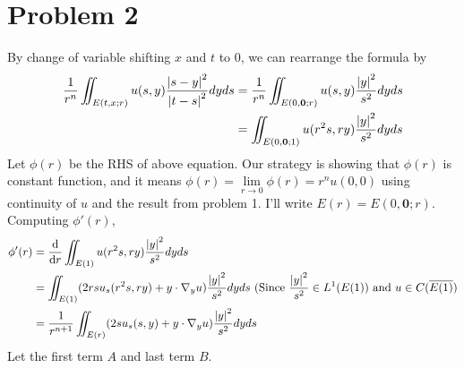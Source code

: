 \documentclass{article}
\begin{document}
\section*{Problem 2}
By change of variable shifting $x$ and $t$ to 0, we can rearrange the formula by 
\begin{equation*}
\begin{split}
\frac{1}{r^n}\iint_{E(t,x;r)}u(s,y)\frac{\abs{s-y}^2}{\abs{t-s}^2}dyds&=\frac{1}{r^n}\iint_{E(0,\bm{0};r)}u(s,y)\frac{\abs{y}^2}{s^2}dyds\\
&=\iint_{E(0,\bm{0};1)}u(r^2s,ry)\frac{\abs{y}^2}{s^2}dyds
\end{split}
\end{equation*}
Let $\phi(r)$ be the RHS of above equation. Our strategy is showing that $\phi(r)$ is constant function, and it means $\phi(r)=\lim\limits_{r\rightarrow 0} \phi(r)=r^n u(0,0)$ using continuity of $u$ and the result from problem 1. I'll write $E(r)=E(0,\bm{0};r)$.
Computing $\phi'(r)$,
\begin{equation*}
\begin{split}
\phi'(r)&=\dv{r}\iint_{E(1)} u(r^2s,ry)\frac{\abs{y}^2}{s^2}dyds \\
&= \iint_{E(1)}(2rsu_s(r^2s, ry)+y\cdot \nabla_y u)\frac{\abs{y}^2}{s^2}dyds \text { (Since }\frac{\abs{y}^2}{s^2}\in L^1(E(1)) \text{ and } u\in C(\overline{E(1)}) \\
&= \frac{1}{r^{n+1}}\iint_{E(r)}(2su_s(s,y)+y\cdot \nabla_y u)\frac{\abs{y}^2}{s^2}dyds
\end{split}
\end{equation*}
Let the first term $A$ and last term $B$.
\end{document}
